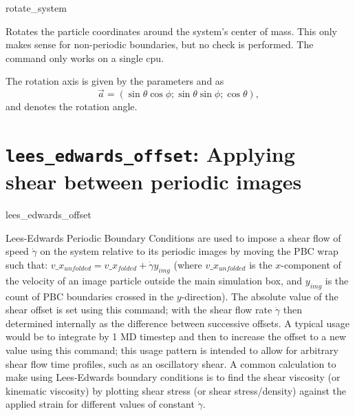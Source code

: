 \begin{essyntax}
   rotate_system   
\end{essyntax}

Rotates the particle coordinates around the system's center of mass. This only makes sense for non-periodic boundaries, but no check is performed. The command only works on a single cpu.

The rotation axis is given by the parameters  and  as
\begin{equation}
\vec{a} = (\sin \theta \cos \phi ; \sin \theta \sin \phi ; \cos \theta),
\end{equation}
and  denotes the rotation angle.


\section{\texttt{lees_edwards_offset}: Applying shear between periodic images}
\label{sec:lees-edwards}


\begin{essyntax}
   lees_edwards_offset   
  \begin{features}
  \end{features}

\end{essyntax}

Lees-Edwards Periodic Boundary Conditions are used to impose a shear flow of speed $\dot{\gamma}$ on the system relative to its periodic images by moving the PBC wrap such that:  $v\_x_{unfolded} =  v\_x_{folded} + \dot{\gamma} y_{img}$ (where $v\_x_{unfolded}$ is the $x$-component of the velocity of an image particle outside the main simulation box, and $y_{img}$ is the count of PBC boundaries crossed in the $y$-direction).  
The absolute value of the shear offset is set using this command; with the shear flow rate $\dot{\gamma}$ then determined internally as the difference between successive offsets.  
A typical usage would be to integrate by 1 {MD} timestep and then to increase the offset to a new value using this command; this usage pattern is intended to allow for arbitrary shear flow time profiles, such as an oscillatory shear.  
A common calculation to make using Lees-Edwards boundary conditions is to find the shear viscosity (or kinematic viscosity) by plotting shear stress (or shear stress/density) against the applied strain for different values of constant $\dot{\gamma}$. 

